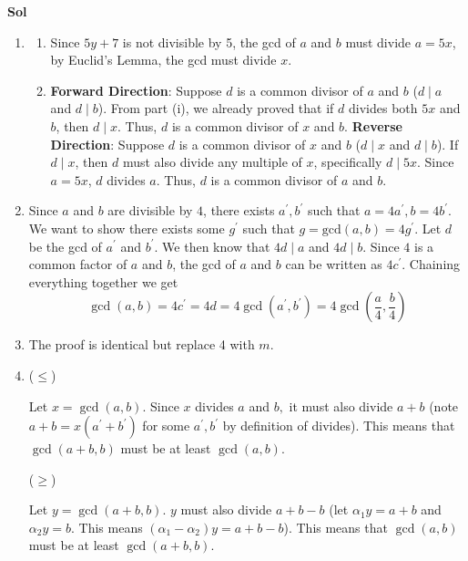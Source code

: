 \documentclass{article}
\begin{document}
\begin{enumerate}
\textbf{Sol}
\begin{enumerate}
    \item \begin{enumerate}
        \item Since \(5y+7\) is not divisible by 5, the gcd of \(a\) and \(b\) must divide \(a=5x\), by Euclid's Lemma, the gcd must divide \(x\). 
        \item \textbf{Forward Direction}: Suppose $d$ is a common divisor of $a$ and $b$ ($d \mid a$ and $d \mid b$). From part (i), we already proved that if $d$ divides both $5x$ and $b$, then $d \mid x$. Thus, $d$ is a common divisor of $x$ and $b$. \textbf{Reverse Direction}: Suppose $d$ is a common divisor of $x$ and $b$ ($d \mid x$ and $d \mid b$). If $d \mid x$, then $d$ must also divide any multiple of $x$, specifically $d \mid 5x$. Since $a = 5x$, $d$ divides $a$. Thus, $d$ is a common divisor of $a$ and $b$.
    \end{enumerate} 
    \item Since \(a\) and \(b \) are divisible by \(4\), there exists \(a^\prime,b^\prime\) such that \(a = 4a^\prime, b = 4b^\prime\). We want to show there exists some \(g^\prime\) such that \(g = \text{gcd}(a,b) = 4g^\prime\). Let \(d\) be the gcd of \(a^\prime\) and \(b^\prime\). We then know that \(4d\mid a\) and \(4d\mid b\). Since \(4\) is a common factor of \(a\) and \(b\), the gcd of \(a\) and \(b\) can be written as \(4c^\prime\). Chaining everything together we get 
    \begin{equation}
        \gcd(a,b) = 4c^\prime = 4d = 4\gcd(a^\prime,b^\prime) = 4\gcd \left(\frac{a}{4},\frac{b}{4}\right)
    \end{equation}
    \item The proof is identical but replace 4 with \(m\). 
    \item 
    (\(\leq\)) 
    
    Let \(x=\gcd(a,b)\). Since \(x\) divides \(a\) and \(b, \) it must also divide \(a+b\) (note \(a+b = x(a^\prime + b^\prime)\) for some \(a^\prime, b^\prime \) by definition of divides). This means that \(\gcd(a+b,b)\) must be at least \(\gcd(a,b)\). 

    (\(\geq\))

    Let \(y=\gcd(a+b,b)\). \(y\) must also divide \(a+b-b\) (let \(\alpha_1 y = a+b\) and \(\alpha_2 y = b\). This means \((\alpha_1-\alpha_2 )y = a + b - b\)). This means that \(\gcd(a,b)\) must be at least \(\gcd(a+b,b)\). 


\end{enumerate}
\end{enumerate}
\end{document}
